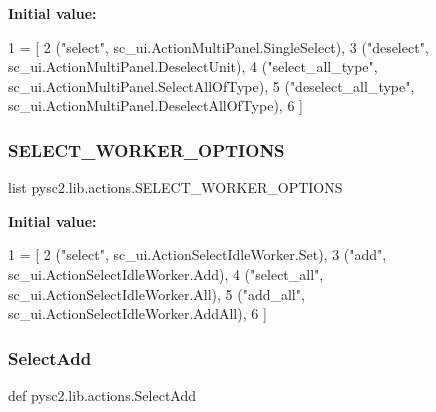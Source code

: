 {\bfseries Initial value\+:}
\begin{DoxyCode}
1 =  [
2     (\textcolor{stringliteral}{"select"}, sc\_ui.ActionMultiPanel.SingleSelect),
3     (\textcolor{stringliteral}{"deselect"}, sc\_ui.ActionMultiPanel.DeselectUnit),
4     (\textcolor{stringliteral}{"select\_all\_type"}, sc\_ui.ActionMultiPanel.SelectAllOfType),
5     (\textcolor{stringliteral}{"deselect\_all\_type"}, sc\_ui.ActionMultiPanel.DeselectAllOfType),
6 ]
\end{DoxyCode}
\mbox{\label{namespacepysc2_1_1lib_1_1actions_a8e81cb4be4879386dbbbd3f9d1cb3e04}} 
\subsubsection{\texorpdfstring{S\+E\+L\+E\+C\+T\+\_\+\+W\+O\+R\+K\+E\+R\+\_\+\+O\+P\+T\+I\+O\+NS}{SELECT\_WORKER\_OPTIONS}}
{\footnotesize\ttfamily list pysc2.\+lib.\+actions.\+S\+E\+L\+E\+C\+T\+\_\+\+W\+O\+R\+K\+E\+R\+\_\+\+O\+P\+T\+I\+O\+NS}

{\bfseries Initial value\+:}
\begin{DoxyCode}
1 =  [
2     (\textcolor{stringliteral}{"select"}, sc\_ui.ActionSelectIdleWorker.Set),
3     (\textcolor{stringliteral}{"add"}, sc\_ui.ActionSelectIdleWorker.Add),
4     (\textcolor{stringliteral}{"select\_all"}, sc\_ui.ActionSelectIdleWorker.All),
5     (\textcolor{stringliteral}{"add\_all"}, sc\_ui.ActionSelectIdleWorker.AddAll),
6 ]
\end{DoxyCode}
\mbox{\label{namespacepysc2_1_1lib_1_1actions_a9a5eb3a062eade5b7b4aebd9469874d8}} 
\subsubsection{\texorpdfstring{Select\+Add}{SelectAdd}}
{\footnotesize\ttfamily def pysc2.\+lib.\+actions.\+Select\+Add}

